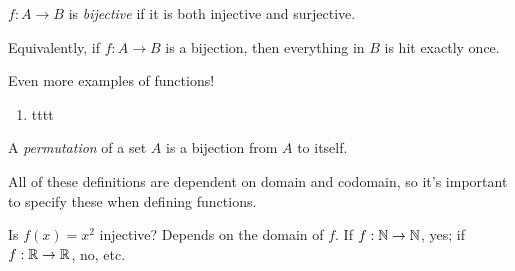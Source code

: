 \documentclass{../../template/note}
\begin{document}
    \begin{definition}
        \(f: A \to B\) is \emph{bijective} if it is both injective and surjective.
    \end{definition}
    \noindent Equivalently, if \(f: A \to B\) is a bijection, then everything in \(B\) is hit exactly once.
    
    \begin{example}
        Even more examples of functions!

        \begin{enumerate}[label=\protect\circled{\arabic*}]
            \item tttt
        \end{enumerate}
        
        
    \end{example}

    \begin{definition}
        A \emph{permutation} of a set \(A\) is a bijection from \(A\) to itself.
    \end{definition}
    
    All of these definitions are dependent on domain and codomain, so it's important to specify these when defining functions.

    \begin{example}
        Is \(f(x) = x^2\) injective? Depends on the domain of \(f\). If \(f: \mathbb N \to \mathbb N\), yes; if \(f: \mathbb R \to \mathbb R\), no, etc.
    \end{example}
    
\end{document}
